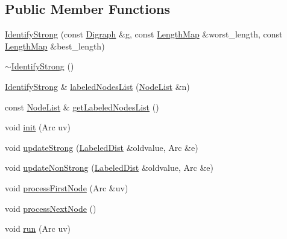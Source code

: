 \subsection*{Public Member Functions}
\begin{DoxyCompactItemize}
\item 
\hyperlink{classlemon_1_1_identify_strong_a670f102e66ed601fb20c195a9111f636}{Identify\+Strong} (const \hyperlink{classlemon_1_1_identify_strong_a8cf9250557b236f81e713bf32a048d49}{Digraph} \&g, const \hyperlink{classlemon_1_1_identify_strong_ac2cd2d54ff91cc726fec23ff1534bd0c}{Length\+Map} \&worst\+\_\+length, const \hyperlink{classlemon_1_1_identify_strong_ac2cd2d54ff91cc726fec23ff1534bd0c}{Length\+Map} \&best\+\_\+length)
\item 
\hyperlink{classlemon_1_1_identify_strong_aada7f022421e480afa01553ccd3ef246}{$\sim$\+Identify\+Strong} ()
\item 
\hyperlink{classlemon_1_1_identify_strong}{Identify\+Strong} \& \hyperlink{classlemon_1_1_identify_strong_abcd4713c4aba7b526e8238b345f37061}{labeled\+Nodes\+List} (\hyperlink{classlemon_1_1_identify_strong_a9c68da1def7665b299ca1896f9bdd59d}{Node\+List} \&n)
\item 
const \hyperlink{classlemon_1_1_identify_strong_a9c68da1def7665b299ca1896f9bdd59d}{Node\+List} \& \hyperlink{classlemon_1_1_identify_strong_a1d520289257e1b92d98e924c256aee24}{get\+Labeled\+Nodes\+List} ()
\item 
void \hyperlink{classlemon_1_1_identify_strong_af427f870411047d02b3896e766e50356}{init} (Arc uv)
\item 
void \hyperlink{classlemon_1_1_identify_strong_ae2780dc0b6fbf60925fd85489b9878ae}{update\+Strong} (\hyperlink{classlemon_1_1_identify_strong_a6b5339bd594571c5085ef41d9ddeafa0}{Labeled\+Dist} \&oldvalue, Arc \&e)
\item 
void \hyperlink{classlemon_1_1_identify_strong_a5ddb1c6472742727d7119c912193c768}{update\+Non\+Strong} (\hyperlink{classlemon_1_1_identify_strong_a6b5339bd594571c5085ef41d9ddeafa0}{Labeled\+Dist} \&oldvalue, Arc \&e)
\item 
void \hyperlink{classlemon_1_1_identify_strong_aec245a25bd467a28ed5660aafc60550b}{process\+First\+Node} (Arc \&uv)
\item 
void \hyperlink{classlemon_1_1_identify_strong_aaf7dd46356fb66261d5d48c3f840978e}{process\+Next\+Node} ()
\item 
void \hyperlink{classlemon_1_1_identify_strong_ae54664c75b5d3be960806bfe5bb3db98}{run} (Arc uv)
\end{DoxyCompactItemize}


